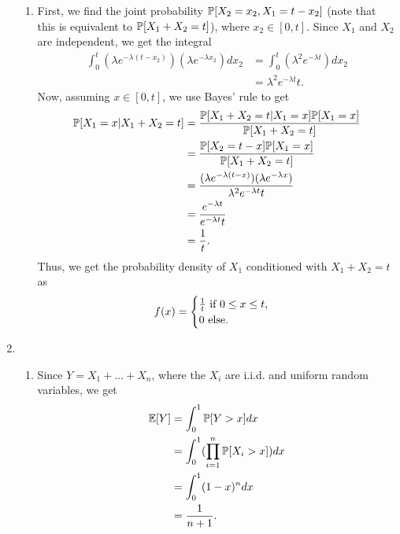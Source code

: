 \begin{enumerate}
\begin{enumerate}
        \item First, we find the joint probability $\P[X_2 = x_2, X_1 = t - x_2]$ (note that this is equivalent to $\P[X_1 + X_2 = t]$), where $x_2 \in [0, t]$. Since $X_1$ and $X_2$ are independent, we get the integral
        \begin{align*}
            \int_0^t(\lambda e^{-\lambda(t - x_2)})(\lambda e^{-\lambda x_2})dx_2 &= \int_0^t(\lambda^2e^{-\lambda t})dx_2 \\
                &= \lambda^2e^{-\lambda t}t.
        \end{align*}
        Now, assuming $x \in [0, t]$, we use Bayes' rule to get
        \begin{align*}
            \P[X_1 = x | X_1 + X_2 = t] &= \frac{\P[X_1 + X_2 = t | X_1 = x]\P[X_1 = x]}{\P[X_1 + X_2 = t]} \\
                &= \frac{\P[X_2 = t - x]\P[X_1 = x]}{\P[X_1 + X_2 = t]} \\
                &= \frac{(\lambda e^{-\lambda(t - x)})(\lambda e^{-\lambda x})}{\lambda^2e^{-\lambda t}t} \\
                &= \frac{e^{-\lambda t}}{e^{-\lambda t}t} \\
                &= \frac{1}{t}.
        \end{align*}
        Thus, we get the probability density of $X_1$ conditioned with $X_1 + X_2 = t$ as
        \[
        f(x) =
        \begin{cases}
            \frac{1}{t} \f{ if } 0 \leq x \leq t, \\
            0 \f{ else.}
        \end{cases}
        \]
    \end{enumerate}
    
    \item \begin{enumerate}
        \item Since $Y = X_1 + \dots + X_n$, where the $X_i$ are i.i.d. and uniform random variables, we get
        \begin{align*}
            \E[Y] &= \int_0^1 \P[Y > x] dx \\
                &= \int_0^1(\prod_{i = 1}^n \P[X_i > x]) dx \\
                &= \int_0^1 (1 - x)^n dx \\
                &= \frac{1}{n+1}.
        \end{align*}
        

\end{enumerate}
\end{enumerate}
